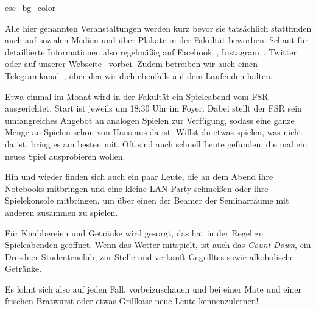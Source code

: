 \label{cha:veranstaltungen}

\begin{awesomeblock}{2pt}{\faInfoCircle}{ese_bg_color}
    \begin{minipage}[t]{.82\textwidth}
        Alle hier genannten Veranstaltungen werden kurz bevor sie tatsächlich
        stattfinden auch auf sozialen Medien und über Plakate in der Fakultät
        beworben. Schaut für detaillierte Informationen also regelmäßig auf
        Facebook~,
        Instagram~,
        Twitter~ oder auf unserer
        Webseite~ vorbei. Zudem betreiben wir auch
        einen Telegramkanal~, über den wir dich ebenfalls auf dem
        Laufenden halten.
    \end{minipage}
\end{awesomeblock}


Etwa einmal im Monat wird in der Fakultät ein Spieleabend vom FSR ausgerichtet. Start ist jeweils um 18:30 Uhr im Foyer. Dabei stellt der FSR sein umfangreiches Angebot an analogen Spielen zur Verfügung, sodass eine ganze Menge an Spielen schon von Haus aus da ist. Willst du etwas spielen, was nicht da ist, bring es am besten mit. Oft sind auch schnell Leute gefunden, die mal ein neues Spiel ausprobieren wollen.

Hin und wieder finden sich auch ein paar Leute, die an dem Abend ihre Notebooks mitbringen und eine kleine LAN-Party schmeißen oder ihre Spielekonsole mitbringen, um über einen der Beamer der Seminarräume mit anderen zusammen zu spielen.

Für Knabbereien und Getränke wird gesorgt, das \ascii{} hat in der Regel zu Spieleabenden geöffnet. Wenn das Wetter mitspielt, ist auch das \emph{Count Down}, ein Dresdner Studentenclub, zur Stelle und verkauft Gegrilltes sowie alkoholische Getränke.

Es lohnt sich also auf jeden Fall, vorbeizuschauen und bei einer Mate und einer frischen Bratwurst oder etwas Grillkäse neue Leute kennenzulernen!


%

